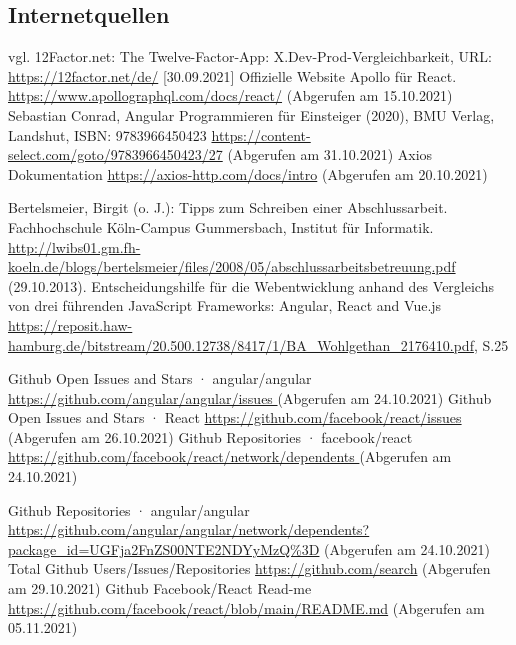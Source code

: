 \subsection{Internetquellen}
\begin{thebibliography}{HR08} %

 vgl. 12Factor.net: The Twelve-Factor-App: X.Dev-Prod-Vergleichbarkeit, URL: \url{https://12factor.net/de/} [30.09.2021]
Offizielle Website Apollo für React. \url{https://www.apollographql.com/docs/react/} (Abgerufen am 15.10.2021)
 Sebastian Conrad, Angular Programmieren für Einsteiger (2020), BMU Verlag, Landshut, ISBN: 9783966450423 \url{https://content-select.com/goto/9783966450423/27} (Abgerufen am 31.10.2021)
Axios Dokumentation \url{https://axios-http.com/docs/intro} (Abgerufen am 20.10.2021)

Bertelsmeier, Birgit (o. J.): Tipps zum Schrei\-b\-en ei\-n\-er Ab\-sch\-luss\-ar\-beit. Fach\-hoch\-schu\-le Köln-Campus Gummersbach, Institut für Informatik. \url{http://lwibs01.gm.fh-koeln.de/blogs/bertelsmeier/files/2008/05/abschlussarbeitsbetreuung.pdf} (29.10.2013).
Entscheidungshilfe für die Webentwicklung anhand des Vergleichs von drei führenden JavaScript Frameworks: Angular, React and Vue.js \url{https://reposit.haw-hamburg.de/bitstream/20.500.12738/8417/1/BA_Wohlgethan_2176410.pdf}, S.25


Github Open Issues and Stars · angular/angular \url{ https://github.com/angular/angular/issues }  (Abgerufen am 24.10.2021)
 Github Open Issues and Stars · React \url{https://github.com/facebook/react/issues} (Abgerufen am 26.10.2021)
 Github Repositories · facebook/react \url{ https://github.com/facebook/react/network/dependents } (Abgerufen am 24.10.2021)

 Github Repositories · angular/angular \url{https://github.com/angular/angular/network/dependents?package_id=UGFja2FnZS00NTE2NDYyMzQ%3D}  (Abgerufen am 24.10.2021)
 Total Github Users/Issues/Repositories \url{ https://github.com/search}  (Abgerufen am 29.10.2021)
 Github Facebook/React Read-me \url{ https://github.com/facebook/react/blob/main/README.md}  (Abgerufen am 05.11.2021)



\end{thebibliography}
